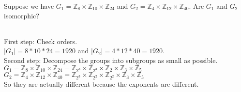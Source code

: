 \begin{exercise}
    Suppose we have $G_1 = \mathbb{Z}_8 \times \mathbb{Z}_{10} \times \mathbb{Z}_{24}$ and $G_2 = \mathbb{Z}_4 \times \mathbb{Z}_{12} \times \mathbb{Z}_{40}$.
    Are $G_1$ and $G_2$ isomorphic?
\end{exercise}
\begin{answer}
    \vphantom{}\\
    First step: Check orders.\\
    $|G_1| = 8 * 10 * 24 = 1920$ and $|G_2| = 4 * 12 * 40 = 1920$.\\ 
    Second step: Decompose the groups into subgroups as small as possible.\\
    $G_1 = \mathbb{Z}_8 \times \mathbb{Z}_{10} \times \mathbb{Z}_{24} = 
    \mathbb{Z}_{2^3} \times \mathbb{Z}_{2^3} \times \mathbb{Z}_{2} \times \mathbb{Z}_3 \times \mathbb{Z}_5$\\
    $G_2 = \mathbb{Z}_4 \times \mathbb{Z}_{12} \times \mathbb{Z}_{40} =
    \mathbb{Z}_{2^3} \times \mathbb{Z}_{2^2} \times \mathbb{Z}_{2^2} \times \mathbb{Z}_3 \times \mathbb{Z}_5$\\

    So they are actually different because the exponents are different.
\end{answer}